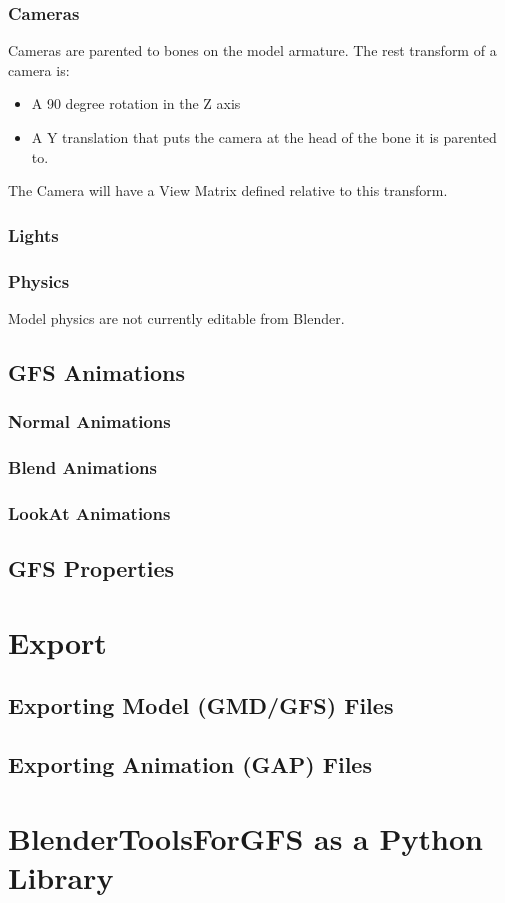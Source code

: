 \documentclass{article}
\begin{document}
\subsubsection{Cameras}
Cameras are parented to bones on the model armature. The rest transform of a camera is:
\begin{itemize}
\item A 90 degree rotation in the Z axis
\item A Y translation that puts the camera at the head of the bone it is parented to.
\end{itemize}
The Camera will have a View Matrix defined relative to this transform.

\subsubsection{Lights}


\subsubsection{Physics}
Model physics are not currently editable from Blender.

\subsection{GFS Animations}

\subsubsection{Normal Animations}

\subsubsection{Blend Animations}

\subsubsection{LookAt Animations}

\subsection{GFS Properties}
\label{SECTION::GfsProperties}


\section{Export}
\subsection{Exporting Model (GMD/GFS) Files}
\subsection{Exporting Animation (GAP) Files}
\clearpage

\section{BlenderToolsForGFS as a Python Library}
\clearpage
\end{document}
